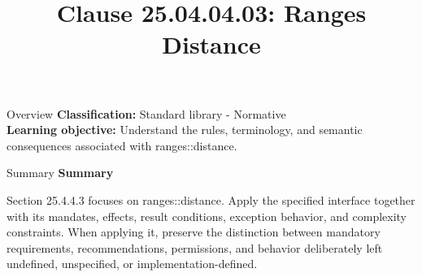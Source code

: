 \documentclass[10pt,letterpaper]{article}
\title{Clause 25.04.04.03: Ranges Distance}
\author{}
\date{}
\begin{document}
\maketitle
\begin{CornellOverviewBox}{Overview}
\textbf{Classification:} Standard library - Normative\\[2pt]
\textbf{Learning objective:} Understand the rules, terminology, and semantic consequences associated with ranges::distance.
\end{CornellOverviewBox}\begin{CornellSummaryBox}{Summary}
{\sffamily\bfseries\color{Accent} Summary}\par\vspace{3pt}Section 25.4.4.3 focuses on ranges::distance. Apply the specified interface together with its mandates, effects, result conditions, exception behavior, and complexity constraints. When applying it, preserve the distinction between mandatory requirements, recommendations, permissions, and behavior deliberately left undefined, unspecified, or implementation-defined.
\end{CornellSummaryBox}
\end{document}

